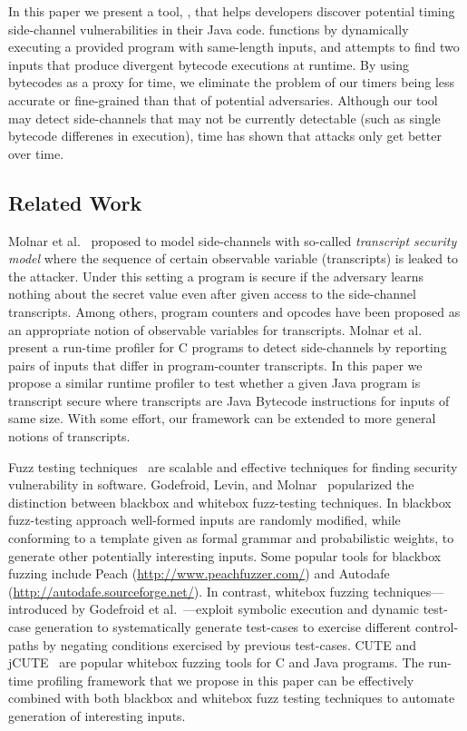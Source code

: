 In this paper we present a tool, \jcupid, that helps developers discover
potential timing side-channel vulnerabilities in their Java code. \jcupid
functions by dynamically executing a provided program with same-length inputs,
and attempts to find two inputs that produce divergent bytecode executions at
runtime. By using bytecodes as a proxy for time, we eliminate the problem of
our timers being less accurate or fine-grained than that of potential
adversaries. Although our tool may detect side-channels that may not be currently
detectable (such as single bytecode differenes in execution), time has shown
that attacks only get better over time.

\subsection{Related Work} 

Molnar et al.~\cite{Molnar05} proposed to model side-channels with
so-called \emph{transcript security model} where the sequence of certain
observable variable (transcripts) is leaked to the attacker.
Under this setting a program is secure if the adversary learns nothing about the
secret value even after given access to the side-channel transcripts.
Among others, program counters and opcodes have been proposed as an appropriate
notion of observable variables for transcripts.
Molnar et al.~\cite{Molnar05} present a run-time profiler for C programs to
detect side-channels by reporting pairs of inputs that differ in program-counter
transcripts.
In this paper we propose a similar runtime profiler to test whether a given
Java program is transcript secure where transcripts are Java Bytecode
instructions for inputs of same size.
With some effort, our framework can be extended to more general notions of
transcripts.

Fuzz testing techniques~\cite{God12} are scalable and effective techniques for finding security
vulnerability in software.
Godefroid, Levin, and Molnar~\cite{God12} popularized the distinction between
blackbox and whitebox fuzz-testing techniques.
In blackbox fuzz-testing approach well-formed inputs are randomly modified,
while conforming to a template given as formal grammar and probabilistic
weights, to generate other potentially interesting inputs.  
Some popular tools for blackbox fuzzing include Peach 
(\url{http://www.peachfuzzer.com/}) and Autodafe
(\url{http://autodafe.sourceforge.net/}).
In contrast, whitebox fuzzing techniques---introduced by Godefroid et
al.~\cite{God12,GKS05}---exploit symbolic execution and dynamic test-case generation
to systematically generate test-cases to exercise different control-paths by
negating conditions exercised by previous test-cases.
CUTE and jCUTE~\cite{Sen2006} are popular whitebox fuzzing tools for C and Java
programs. 
The run-time profiling framework that we propose in this paper can be
effectively combined with both blackbox and whitebox fuzz testing techniques to
automate generation of interesting inputs.


